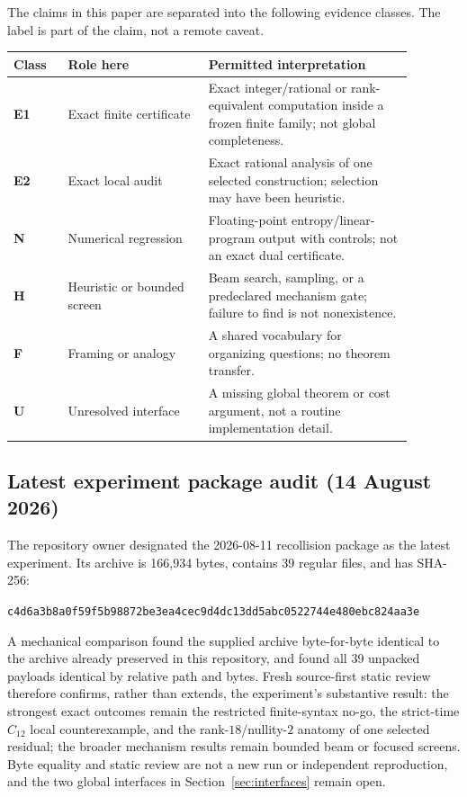 \documentclass[11pt]{article}
\begin{document}
The claims in this paper are separated into the following evidence classes. The label is part of the claim, not a remote caveat.

\begin{center}
\begin{tabular}{>{\bfseries}p{0.12\linewidth}p{0.31\linewidth}p{0.45\linewidth}}
\toprule
Class & Role here & Permitted interpretation \\
\midrule
E1 & Exact finite certificate & Exact integer/rational or rank-equivalent computation inside a frozen finite family; not global completeness. \\
E2 & Exact local audit & Exact rational analysis of one selected construction; selection may have been heuristic. \\
N & Numerical regression & Floating-point entropy/linear-program output with controls; not an exact dual certificate. \\
H & Heuristic or bounded screen & Beam search, sampling, or a predeclared mechanism gate; failure to find is not nonexistence. \\
F & Framing or analogy & A shared vocabulary for organizing questions; no theorem transfer. \\
U & Unresolved interface & A missing global theorem or cost argument, not a routine implementation detail. \\
\bottomrule
\end{tabular}
\end{center}

\subsection*{Latest experiment package audit (14 August 2026)}

The repository owner designated the 2026-08-11 recollision package as the latest experiment. Its archive is 166,934 bytes, contains 39 regular files, and has SHA-256:
\begin{center}
{\footnotesize\texttt{c4d6a3b8a0f59f5b98872be3ea4cec9d4dc13dd5abc0522744e480ebc824aa3e}}
\end{center}
A mechanical comparison found the supplied archive byte-for-byte identical to the archive already preserved in this repository, and found all 39 unpacked payloads identical by relative path and bytes. Fresh source-first static review therefore confirms, rather than extends, the experiment's substantive result: the strongest exact outcomes remain the restricted finite-syntax no-go, the strict-time $C_{12}$ local counterexample, and the rank-$18$/nullity-$2$ anatomy of one selected residual; the broader mechanism results remain bounded beam or focused screens. Byte equality and static review are not a new run or independent reproduction, and the two global interfaces in Section~\ref{sec:interfaces} remain open.
\end{document}
